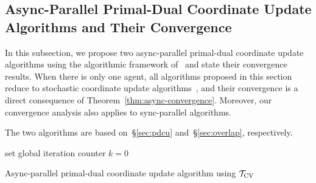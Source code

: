 {{{\subsection{Async-Parallel Primal-Dual Coordinate Update Algorithms and Their Convergence}

In this subsection, we propose two async-parallel primal-dual coordinate update algorithms using the algorithmic framework of~\cite{Peng_2015_AROCK} and state their convergence results.
When there is only one agent, all algorithms proposed in this section reduce to stochastic coordinate update algorithms~\cite{Patrick_2015}, and their convergence is a direct consequence of Theorem~\ref{thm:async-convergence}. Moreover, our convergence analysis also applies to sync-parallel algorithms.



The two algorithms are based on~\S\ref{sec:pdcu} and~\S\ref{sec:overlap}, respectively.





\begin{algorithm}[H]\label{alg:asyn_core}
{}
 set global iteration
counter $k=0$\; 
 \caption{Async-parallel primal-dual coordinate update algorithm using ${{\mathcal{T}}_{\textnormal{CV}}}$}
\end{algorithm}

}}}

